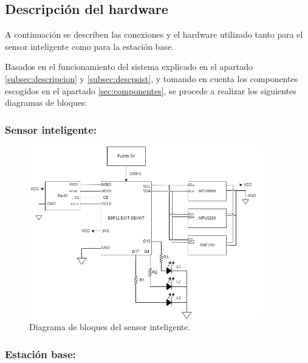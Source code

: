 \subsection{Descripción del hardware}

A continuación se describen las conexiones y el hardware utilizado tanto para el sensor inteligente como para la estación base.

Basados en el funcionamiento del sistema explicado en el apartado \ref{subsec:descripcion} y \ref{subsec:descpsist}, y tomando en cuenta los componentes escogidos en el apartado \ref{sec:componentes}, se procede a realizar los siguientes diagramas de bloques: 

\subsubsection{Sensor inteligente:}

\begin{figure}[H]
    \centering
    \includegraphics[width = 0.9\textwidth]{imagenes/cap2_marcometod/DiagramaHardwareSmartSensor.png}
    \caption{Diagrama de bloques del sensor inteligente.}
    \label{fig:smartsensorbloques}
\end{figure}

\subsubsection{Estación base:}


